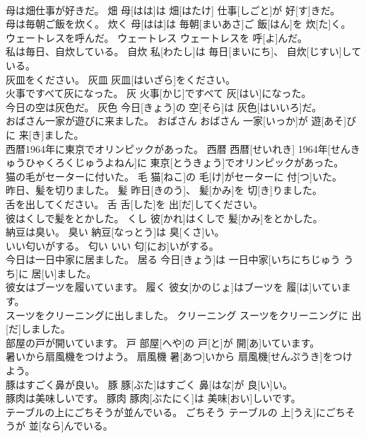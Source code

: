 \documentclass[8pt]{extreport}
\begin{document}
\begin{CJK}{UTF8}{min}
\\	母は畑仕事が好きだ。	畑	母[はは]は 畑[はたけ] 仕事[しごと]が 好[す]きだ。	
\\	母は毎朝ご飯を炊く。	炊く	母[はは]は 毎朝[まいあさ]ご 飯[はん]を 炊[た]く。	
\\	ウェートレスを呼んだ。	ウェートレス	ウェートレスを 呼[よ]んだ。	
\\	私は毎日、自炊している。	自炊	私[わたし]は 毎日[まいにち]、 自炊[じすい]している。	
\\	灰皿をください。	灰皿	灰皿[はいざら]をください。	
\\	火事ですべて灰になった。	灰	火事[かじ]ですべて 灰[はい]になった。	
\\	今日の空は灰色だ。	灰色	今日[きょう]の 空[そら]は 灰色[はいいろ]だ。	
\\	おばさん一家が遊びに来ました。	おばさん	おばさん 一家[いっか]が 遊[あそ]びに 来[き]ました。	
\\	西暦1964年に東京でオリンピックがあった。	西暦	西暦[せいれき] 1964年[せんきゅうひゃくろくじゅうよねん]に 東京[とうきょう]でオリンピックがあった。	
\\	猫の毛がセーターに付いた。	毛	猫[ねこ]の 毛[け]がセーターに 付[つ]いた。	
\\	昨日、髪を切りました。	髪	昨日[きのう]、 髪[かみ]を 切[き]りました。	
\\	舌を出してください。	舌	舌[した]を 出[だ]してください。	
\\	彼はくしで髪をとかした。	くし	彼[かれ]はくしで 髪[かみ]をとかした。	
\\	納豆は臭い。	臭い	納豆[なっとう]は 臭[くさ]い。	
\\	いい匂いがする。	匂い	いい 匂[にお]いがする。	
\\	今日は一日中家に居ました。	居る	今日[きょう]は 一日中家[いちにちじゅう うち]に 居[い]ました。	
\\	彼女はブーツを履いています。	履く	彼女[かのじょ]はブーツを 履[は]いています。	
\\	スーツをクリーニングに出しました。	クリーニング	スーツをクリーニングに 出[だ]しました。	
\\	部屋の戸が開いています。	戸	部屋[へや]の 戸[と]が 開[あ]いています。	
\\	暑いから扇風機をつけよう。	扇風機	暑[あつ]いから 扇風機[せんぷうき]をつけよう。	
\\	豚はすごく鼻が良い。	豚	豚[ぶた]はすごく 鼻[はな]が 良[い]い。	
\\	豚肉は美味しいです。	豚肉	豚肉[ぶたにく]は 美味[おい]しいです。	
\\	テーブルの上にごちそうが並んでいる。	ごちそう	テーブルの 上[うえ]にごちそうが 並[なら]んでいる。	

\end{CJK}
\end{document}
